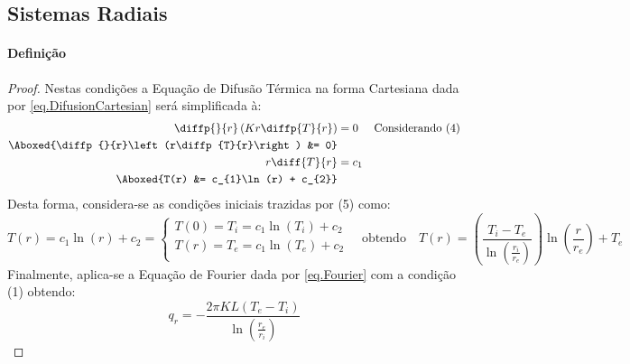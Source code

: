 \documentclass{article}
\begin{document}
        \subsection{Sistemas Radiais}
            \paragraph{Definição}
                \begin{proof}
                    Nestas condições a Equação de Difusão Térmica na forma Cartesiana dada por \ref{eq.DifusionCartesian} será simplificada à:
                        \begin{align*}
                            \diffp{}{r}\left(Kr\diffp{T}{r}\right) &= 0 & \text{Considerando (4)}\\
                            \Aboxed{\diffp{}{r}\left(r\diffp{T}{r}\right) &= 0}\\
                            r\diff{T}{r} &= c_{1}\\
                            \Aboxed{T(r) &= c_{1}\ln(r) + c_{2}}\\
                        \end{align*}
                    Desta forma, considera-se as condições iniciais trazidas por (5) como:
                        \begin{equation*}
                            T(r) = c_{1}\ln(r) + c_{2} = 
                            \begin{cases}
                                T(0) = T_{i} = c_{1}\ln(T_{i}) + c_{2}\\
                                T(r) = T_{e} = c_{1}\ln(T_{e}) + c_{2}\\
                            \end{cases}
                            \quad
                            \text{obtendo}
                            \quad
                            \boxed{
                                T(r) = 
                                \left(\frac{T_{i} - T_{e}}{\ln\left(\frac{r_{i}}{r_{e}}\right)}\right)
                                \ln\left(\frac{r}{r_{e}}\right) + T_{e}
                            }
                        \end{equation*}
                    Finalmente, aplica-se a Equação de Fourier dada por \ref{eq.Fourier} com a condição (1) obtendo:
                        \begin{equation*}
                            \boxed{q_{r} = -\frac{2\pi KL(T_{e} - T_{i})}{\ln\left(\frac{r_{e}}{r_{i}}\right)}}
                        \end{equation*}
                \end{proof}
\end{document}
